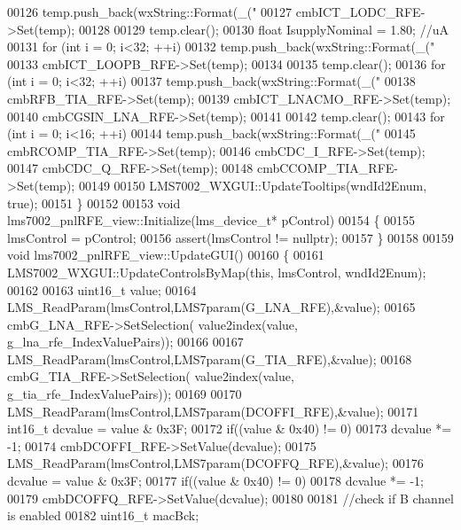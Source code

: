 \begin{DoxyCode}
{{00126         temp.push\_back(wxString::Format(\_(\textcolor{stringliteral}{"%
00127     cmbICT_LODC_RFE->Set(temp);
00128 
00129     temp.clear();
00130     \textcolor{keywordtype}{float} IsupplyNominal = 1.80; \textcolor{comment}{//uA}
00131     \textcolor{keywordflow}{for} (\textcolor{keywordtype}{int} i = 0; i<32; ++i)
00132         temp.push\_back(wxString::Format(\_(\textcolor{stringliteral}{"%
00133     cmbICT_LOOPB_RFE->Set(temp);
00134 
00135     temp.clear();
00136     \textcolor{keywordflow}{for} (\textcolor{keywordtype}{int} i = 0; i<32; ++i)
00137         temp.push\_back(wxString::Format(\_(\textcolor{stringliteral}{"%
00138     cmbRFB_TIA_RFE->Set(temp);
00139     cmbICT_LNACMO_RFE->Set(temp);
00140     cmbCGSIN_LNA_RFE->Set(temp);
00141 
00142     temp.clear();
00143     \textcolor{keywordflow}{for} (\textcolor{keywordtype}{int} i = 0; i<16; ++i)
00144         temp.push\_back(wxString::Format(\_(\textcolor{stringliteral}{"%
00145     cmbRCOMP_TIA_RFE->Set(temp);
00146     cmbCDC_I_RFE->Set(temp);
00147     cmbCDC_Q_RFE->Set(temp);
00148     cmbCCOMP_TIA_RFE->Set(temp);
00149 
00150     LMS7002_WXGUI::UpdateTooltips(wndId2Enum, \textcolor{keyword}{true});
00151 \}
00152 
00153 \textcolor{keywordtype}{void} lms7002_pnlRFE_view::Initialize(lms_device_t* pControl)
00154 \{
00155     lmsControl = pControl;
00156     assert(lmsControl != \textcolor{keyword}{nullptr});
00157 \}
00158 
00159 \textcolor{keywordtype}{void} lms7002_pnlRFE_view::UpdateGUI()
00160 \{
00161     LMS7002_WXGUI::UpdateControlsByMap(\textcolor{keyword}{this}, lmsControl, wndId2Enum);
00162 
00163     uint16\_t value;
00164     LMS_ReadParam(lmsControl,LMS7param(G_LNA_RFE),&value);
00165     cmbG_LNA_RFE->SetSelection( value2index(value, g_lna_rfe_IndexValuePairs));
00166 
00167     LMS_ReadParam(lmsControl,LMS7param(G_TIA_RFE),&value);
00168     cmbG_TIA_RFE->SetSelection( value2index(value, g_tia_rfe_IndexValuePairs));
00169 
00170     LMS_ReadParam(lmsControl,LMS7param(DCOFFI_RFE),&value);
00171     int16\_t dcvalue = value & 0x3F;
00172     \textcolor{keywordflow}{if}((value & 0x40) != 0)
00173         dcvalue *= -1;
00174     cmbDCOFFI_RFE->SetValue(dcvalue);
00175     LMS_ReadParam(lmsControl,LMS7param(DCOFFQ_RFE),&value);
00176     dcvalue = value & 0x3F;
00177     \textcolor{keywordflow}{if}((value & 0x40) != 0)
00178         dcvalue *= -1;
00179     cmbDCOFFQ_RFE->SetValue(dcvalue);
00180 
00181     \textcolor{comment}{//check if B channel is enabled}
00182     uint16\_t macBck;
}}}}}}
\end{DoxyCode}
